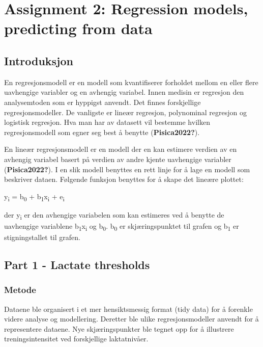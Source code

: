 \documentclass[
  letterpaper,
  DIV=11,
  numbers=noendperiod]{scrreprt}
\begin{document}

\chapter{Assignment 2: Regression models, predicting from
data}\label{assignment2}

\section{Introduksjon}\label{introduksjon-2}

En regresjonsmodell er en modell som kvantifiserer forholdet mellom en
eller flere uavhengige variabler og en avhengig variabel. Innen medisin
er regresjon den analysemtoden som er hyppigst anvendt. Det finnes
forskjellige regresjonsmodeller. De vanligste er lineær regresjon,
polynominal regresjon og logistisk regresjon. Hva man har av datasett
vil bestemme hvilken regresjonsmodell som egner seg best å benytte
(\textbf{Pisica2022?}).

En lineær regresjonsmodell er en modell der en kan estimere verdien av
en avhengig variabel basert på verdien av andre kjente uavhengige
variabler (\textbf{Pisica2022?}). I en slik modell benyttes en rett
linje for å lage en modell som beskriver dataen. Følgende funksjon
benyttes for å skape det lineære plottet:

y\textsubscript{i} = b\textsubscript{0} +
b\textsubscript{1}x\textsubscript{i} + e\textsubscript{i}

der y\textsubscript{i} er den avhengige variabelen som kan estimeres ved
å benytte de uavhengige variablene b\textsubscript{1}x\textsubscript{i}
og b\textsubscript{0}. b\textsubscript{0} er skjæringspunktet til grafen
og b\textsubscript{1} er stigningstallet til grafen.

\section{Part 1 - Lactate thresholds}\label{part-1---lactate-thresholds}

\subsection{Metode}\label{metode-1}

Dataene ble organisert i et mer hensiktsmessig format (tidy data) for å
forenkle videre analyse og modellering. Deretter ble ulike
regresjonsmodeller anvendt for å representere dataene. Nye
skjæringspunkter ble tegnet opp for å illustrere treningsintensitet ved
forskjellige laktatnivåer.
\end{document}
